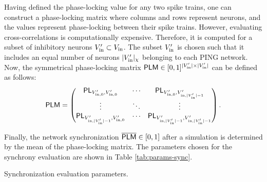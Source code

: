 Having defined the phase-locking value for any two spike trains, one can construct a phase-locking matrix where columns and rows represent neurons, and the values represent phase-locking between their spike trains. However, evaluating cross-correlations is computationally expensive. Therefore, it is computed for a subset of inhibitory neurons $V'_{\mathrm{in}} \subset V_{\mathrm{in}}$. The subset $V'_{\mathrm{in}}$ is chosen such that it includes an equal number of neurons $|V'_{\mathrm{in}}|_\chi$ belonging to each PING network. Now, the symmetrical phase-locking matrix $\mathsf{PLM} \in [0, 1]^{|V'_{\mathrm{in}}| \times |V'_{\mathrm{in}}|}$ can be defined as follows:
\begin{equation}
    \mathsf{PLM} = \begin{pmatrix}
        \mathsf{PL}_{V'_{\mathrm{in}, 0}, V'_{\mathrm{in}, 0}} & \cdots  & \mathsf{PL}_{V'_{\mathrm{in}, 0}, V'_{\mathrm{in}, |V'_{\mathrm{in}}|-1}}  \\
        \vdots & \ddots & \vdots  \\
        \mathsf{PL}_{V'_{\mathrm{in}, |V'_{\mathrm{in}}|-1}, V'_{\mathrm{in}, 0}} & \cdots  &  \mathsf{PL}_{V'_{\mathrm{in}, |V'_{\mathrm{in}}|-1}, V'_{\mathrm{in}, |V'_{\mathrm{in}}|-1}}
    \end{pmatrix}.
\end{equation}

Finally, the network synchronization $\overline{\mathsf{PLM}} \in [0, 1]$ after a simulation is determined by the mean of the phase-locking matrix.
The parameters chosen for the synchrony evaluation are shown in Table \ref{tab:params-sync}.

\begin{table}[H]
    \centering
    
    \caption{Synchronization evaluation parameters.}
    \label{tab:params-sync}
\end{table}




